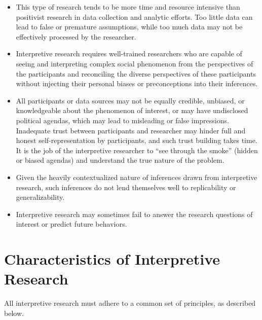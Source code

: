 \begin{itemize}

	\item This type of research tends to be more time and resource intensive than positivist research in data collection and analytic efforts. Too little data can lead to false or premature assumptions, while too much data may not be effectively processed by the researcher.

	\item Interpretive research requires well-trained researchers who are capable of seeing and interpreting complex social phenomenon from the perspectives of the participants and reconciling the diverse perspectives of these participants without injecting their personal biases or preconceptions into their inferences.

	\item All participants or data sources may not be equally credible, unbiased, or knowledgeable about the phenomenon of interest, or may have undisclosed political agendas, which may lead to misleading or false impressions. Inadequate trust between participants and researcher may hinder full and honest self-representation by participants, and such trust building takes time. It is the job of the interpretive researcher to ``see through the smoke'' (hidden or biased agendas) and understand the true nature of the problem.

	\item Given the heavily contextualized nature of inferences drawn from interpretive research, such inferences do not lend themselves well to replicability or generalizability. 

	\item Interpretive research may sometimes fail to answer the research questions of interest or predict future behaviors.

\end{itemize}
\section{Characteristics of Interpretive Research}

All interpretive research must adhere to a common set of principles, as described below.

